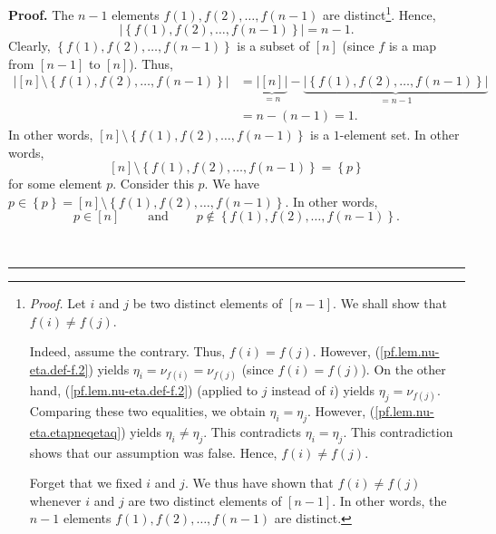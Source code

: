 \documentclass[numbers=enddot,12pt,final,onecolumn,notitlepage,english]{scrartcl}%
\theoremstyle{definition}
\newenvironment{proof}[1][Proof]{\noindent\textbf{#1.} }{\ \rule{0.5em}{0.5em}}
\newenvironment{verlong}{}{}
\begin{document}
\begin{verlong}
\begin{proof}
The $n-1$ elements $f\left(  1\right)  ,f\left(  2\right)  ,\ldots,f\left(
n-1\right)  $ are distinct\footnote{\textit{Proof.} Let $i$ and $j$ be two
distinct elements of $\left[  n-1\right]  $. We shall show that $f\left(
i\right)  \neq f\left(  j\right)  $.
\par
Indeed, assume the contrary. Thus, $f\left(  i\right)  =f\left(  j\right)  $.
However, (\ref{pf.lem.nu-eta.def-f.2}) yields $\eta_{i}=\nu_{f\left(
i\right)  }=\nu_{f\left(  j\right)  }$ (since $f\left(  i\right)  =f\left(
j\right)  $). On the other hand, (\ref{pf.lem.nu-eta.def-f.2}) (applied to $j$
instead of $i$) yields $\eta_{j}=\nu_{f\left(  j\right)  }$. Comparing these
two equalities, we obtain $\eta_{i}=\eta_{j}$. However,
(\ref{pf.lem.nu-eta.etapneqetaq}) yields $\eta_{i}\neq\eta_{j}$. This
contradicts $\eta_{i}=\eta_{j}$. This contradiction shows that our assumption
was false. Hence, $f\left(  i\right)  \neq f\left(  j\right)  $.
\par
Forget that we fixed $i$ and $j$. We thus have shown that $f\left(  i\right)
\neq f\left(  j\right)  $ whenever $i$ and $j$ are two distinct elements of
$\left[  n-1\right]  $. In other words, the $n-1$ elements $f\left(  1\right)
,f\left(  2\right)  ,\ldots,f\left(  n-1\right)  $ are distinct.}. Hence,
\[
\left\vert \left\{  f\left(  1\right)  ,f\left(  2\right)  ,\ldots,f\left(
n-1\right)  \right\}  \right\vert =n-1.
\]
Clearly, $\left\{  f\left(  1\right)  ,f\left(  2\right)  ,\ldots,f\left(
n-1\right)  \right\}  $ is a subset of $\left[  n\right]  $ (since $f$ is a
map from $\left[  n-1\right]  $ to $\left[  n\right]  $). Thus,%
\begin{align*}
\left\vert \left[  n\right]  \setminus\left\{  f\left(  1\right)  ,f\left(
2\right)  ,\ldots,f\left(  n-1\right)  \right\}  \right\vert  &
=\underbrace{\left\vert \left[  n\right]  \right\vert }_{=n}%
-\underbrace{\left\vert \left\{  f\left(  1\right)  ,f\left(  2\right)
,\ldots,f\left(  n-1\right)  \right\}  \right\vert }_{=n-1}\\
&  =n-\left(  n-1\right)  =1.
\end{align*}
In other words, $\left[  n\right]  \setminus\left\{  f\left(  1\right)
,f\left(  2\right)  ,\ldots,f\left(  n-1\right)  \right\}  $ is a $1$-element
set. In other words,
\[
\left[  n\right]  \setminus\left\{  f\left(  1\right)  ,f\left(  2\right)
,\ldots,f\left(  n-1\right)  \right\}  =\left\{  p\right\}
\]
for some element $p$. Consider this $p$. We have $p\in\left\{  p\right\}
=\left[  n\right]  \setminus\left\{  f\left(  1\right)  ,f\left(  2\right)
,\ldots,f\left(  n-1\right)  \right\}  $. In other words,
\[
p\in\left[  n\right]  \ \ \ \ \ \ \ \ \ \ \text{and}%
\ \ \ \ \ \ \ \ \ \ p\notin\left\{  f\left(  1\right)  ,f\left(  2\right)
,\ldots,f\left(  n-1\right)  \right\}  .
\]



\end{proof}
\end{verlong}
\end{document}
